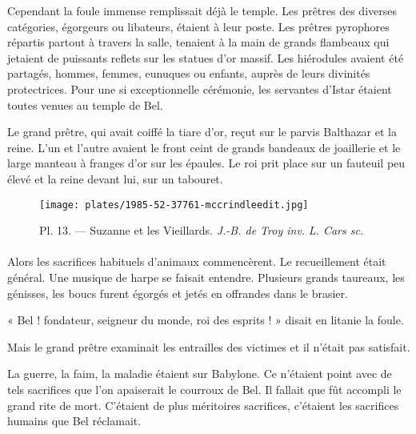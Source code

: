 \documentclass[a4paper, 11pt, oneside, polutonikogreek, french]{article}
\begin{document}
\bigskip
\centerline{\EightStarTaper}
\centerline{\EightStarTaper\EightStarTaper}
\bigskip

Cependant la foule immense remplissait déjà le temple. Les prêtres des diverses catégories, égorgeurs ou libateurs, étaient à leur poste. Les prêtres pyrophores répartis partout à travers la salle, tenaient à la main de grands flambeaux qui jetaient de puissants reflets sur les statues d'or massif. Les hiérodules avaient été partagés, hommes, femmes, eunuques ou enfants, auprès de leurs divinités protectrices. Pour une si exceptionnelle cérémonie, les servantes d'Istar étaient toutes venues au temple de Bel.

Le grand prêtre, qui avait coiffé la tiare d'or, reçut sur le parvis Balthazar et la reine. L'un et l'autre avaient le front ceint de grands bandeaux de joaillerie et le large manteau à franges d'or sur les épaules. Le roi prit place sur un fauteuil peu élevé et la reine devant lui, sur un tabouret.

\bigskip
\centerline{\EightStarTaper}
\centerline{\EightStarTaper\EightStarTaper}
\bigskip
\clearpage
\vspace*{\fill}
\begin{figure}[H]
\centering
\texttt{[image: plates/1985-52-37761-mccrindleedit.jpg]}
\caption{\Fontauri Pl. 13. --- Suzanne et les Vieillards. \emph{J.-B. de Troy inv.} \emph{L. Cars sc.}}
\end{figure}
\vspace*{\fill}
\clearpage
\paragraph{}
Alors les sacrifices habituels d'animaux commencèrent. Le recueillement était général. Une musique de harpe se faisait entendre. Plusieurs grands taureaux, les génisses, les boucs furent égorgés et jetés en offrandes dans le brasier.

« Bel ! fondateur, seigneur du monde, roi des esprits ! » disait en litanie la foule.

Mais le grand prêtre examinait les entrailles des victimes et il n'était pas satisfait.

La guerre, la faim, la maladie étaient sur Babylone. Ce n'étaient point avec de tels sacrifices que l'on apaiserait le courroux de Bel. Il fallait que fût accompli le grand rite de mort. C'étaient de plus méritoires sacrifices, c'étaient les sacrifices humains que Bel réclamait.

\bigskip
\centerline{\EightStarTaper}
\centerline{\EightStarTaper\EightStarTaper}
\bigskip
\end{document}
